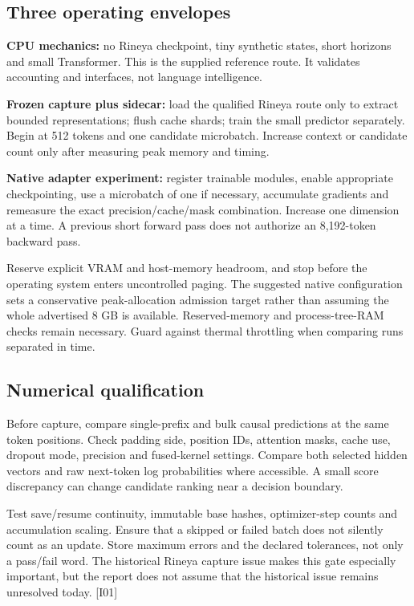 \documentclass[
  11pt,
  a4paper,
]{article}
\begin{document}
\subsection{Three operating envelopes}\label{three-operating-envelopes}

\textbf{CPU mechanics:} no Rineya checkpoint, tiny synthetic states,
short horizons and small Transformer. This is the supplied reference
route. It validates accounting and interfaces, not language
intelligence.

\textbf{Frozen capture plus sidecar:} load the qualified Rineya route
only to extract bounded representations; flush cache shards; train the
small predictor separately. Begin at 512 tokens and one candidate
microbatch. Increase context or candidate count only after measuring
peak memory and timing.

\textbf{Native adapter experiment:} register trainable modules, enable
appropriate checkpointing, use a microbatch of one if necessary,
accumulate gradients and remeasure the exact precision/cache/mask
combination. Increase one dimension at a time. A previous short forward
pass does not authorize an 8,192-token backward pass.

Reserve explicit VRAM and host-memory headroom, and stop before the
operating system enters uncontrolled paging. The suggested native
configuration sets a conservative peak-allocation admission target
rather than assuming the whole advertised 8 GB is available.
Reserved-memory and process-tree-RAM checks remain necessary. Guard
against thermal throttling when comparing runs separated in time.

\subsection{Numerical qualification}\label{numerical-qualification}

Before capture, compare single-prefix and bulk causal predictions at the
same token positions. Check padding side, position IDs, attention masks,
cache use, dropout mode, precision and fused-kernel settings. Compare
both selected hidden vectors and raw next-token log probabilities where
accessible. A small score discrepancy can change candidate ranking near
a decision boundary.

Test save/resume continuity, immutable base hashes, optimizer-step
counts and accumulation scaling. Ensure that a skipped or failed batch
does not silently count as an update. Store maximum errors and the
declared tolerances, not only a pass/fail word. The historical Rineya
capture issue makes this gate especially important, but the report does
not assume that the historical issue remains unresolved today. {[}I01{]}
\end{document}
